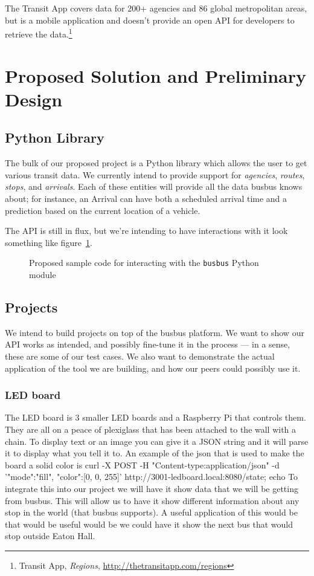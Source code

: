 \documentclass[12pt]{article}
\begin{document}
The Transit App covers data for 200+ agencies
and 86 global metropolitan areas, but is a mobile application and doesn't provide an open API for developers to retrieve the
data.\footnote{Transit App, \textit{Regions}, \url{http://thetransitapp.com/regions}}


\section{Proposed Solution and Preliminary Design}
\subsection{Python Library}
The bulk of our proposed project is a Python library which allows the user to get various transit data.
We currently intend to provide support for \textit{agencies}, \textit{routes}, \textit{stops}, and \textit{arrivals}.
Each of these entities will provide all the data busbus knows about; for instance, an Arrival can have both a scheduled arrival time
and a prediction based on the current location of a vehicle.

The API is still in flux, but we're intending to have interactions with it look something like figure~\ref{fig:pythonsample}.

\begin{figure}[h]
	\begin{center}
		
	\end{center}
	\caption{Proposed sample code for interacting with the \texttt{busbus} Python module}
	\label{fig:pythonsample}
\end{figure}

\subsection{Projects}
We intend to build projects on top of the busbus platform.
We want to show our API works as intended, and possibly
fine-tune it in the process --- in a sense, these are some of our test cases. We also want
to demonstrate the actual application of the tool we are building, and how our peers
could possibly use it.

\subsubsection{LED board}
    The LED board is 3 smaller LED boards and a Raspberry Pi that controls them.  They are all on a peace of plexiglass that has been attached to the wall with a chain.  To display text or an image you can give it a JSON string and it will parse it to display what you tell it to. An example of the json that is used to make the board a solid color is curl -X POST -H "Content-type:application/json" -d '{"mode":"fill", "color":[0, 0, 255]}' http://3001-ledboard.local:8080/state; echo To integrate this into our project we will have it show data that we will be getting from busbus.  This will allow us to have it show different information about any stop in the world (that busbus supports). A useful application of this would be that would be useful would be we could have it show the next bus that would stop outside Eaton Hall.
\end{document}
